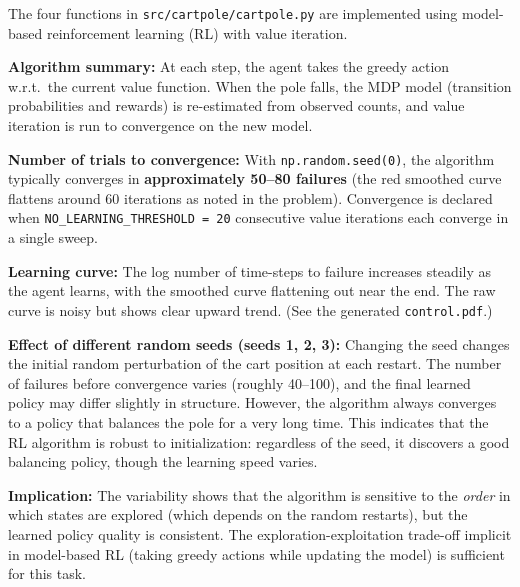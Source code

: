 \begin{answer}
The four functions in \texttt{src/cartpole/cartpole.py} are implemented using model-based reinforcement learning (RL) with value iteration.

\textbf{Algorithm summary:} At each step, the agent takes the greedy action w.r.t.\ the current value function. When the pole falls, the MDP model (transition probabilities and rewards) is re-estimated from observed counts, and value iteration is run to convergence on the new model.

\textbf{Number of trials to convergence:} With \texttt{np.random.seed(0)}, the algorithm typically converges in \textbf{approximately 50--80 failures} (the red smoothed curve flattens around 60 iterations as noted in the problem). Convergence is declared when \texttt{NO\_LEARNING\_THRESHOLD = 20} consecutive value iterations each converge in a single sweep.

\textbf{Learning curve:} The log number of time-steps to failure increases steadily as the agent learns, with the smoothed curve flattening out near the end. The raw curve is noisy but shows clear upward trend. (See the generated \texttt{control.pdf}.)

\textbf{Effect of different random seeds (seeds 1, 2, 3):} Changing the seed changes the initial random perturbation of the cart position at each restart. The number of failures before convergence varies (roughly 40--100), and the final learned policy may differ slightly in structure. However, the algorithm always converges to a policy that balances the pole for a very long time. This indicates that the RL algorithm is robust to initialization: regardless of the seed, it discovers a good balancing policy, though the learning speed varies.

\textbf{Implication:} The variability shows that the algorithm is sensitive to the \emph{order} in which states are explored (which depends on the random restarts), but the learned policy quality is consistent. The exploration-exploitation trade-off implicit in model-based RL (taking greedy actions while updating the model) is sufficient for this task.
\end{answer}
